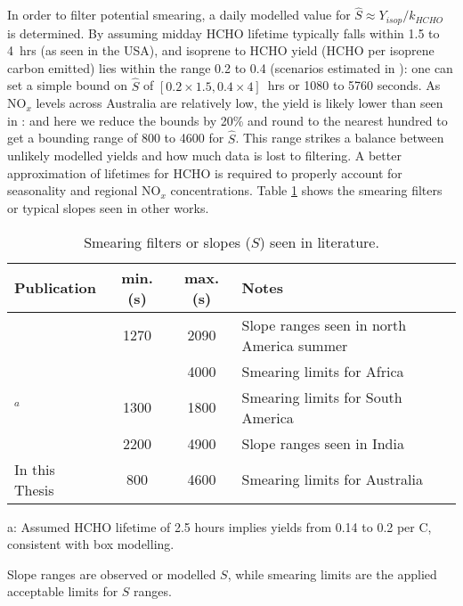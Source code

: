       In order to filter potential smearing, a daily modelled value for $\hat{S} \approx Y_{isop}/k_{HCHO}$ is determined.
      By assuming midday HCHO lifetime typically falls within 1.5 to 4~hrs (as seen in the USA), and isoprene to HCHO yield (HCHO per isoprene carbon emitted) lies within the range 0.2 to 0.4 (scenarios estimated in \textcite{Palmer2003}): one can set a simple bound on $\hat{S}$ of $[0.2 \times 1.5, 0.4 \times 4]$~hrs or 1080 to 5760 seconds.
      As NO$_x$ levels across Australia are relatively low, the yield is likely lower than seen in \textcite{Palmer2003}: and here we reduce the bounds by 20\% and round to the nearest hundred to get a bounding range of 800 to 4600 for $\hat{S}$. 
      This range strikes a balance between unlikely modelled yields and how much data is lost to filtering.
      A better approximation of lifetimes for HCHO is required to properly account for seasonality and regional NO$_x$ concentrations.
      Table \ref{BioIsop:method:smearing:tab_smearing_ranges} shows the smearing filters or typical slopes seen in other works.
      
      \begin{table}\begin{threeparttable}
          \caption{Smearing filters or slopes ($S$) seen in literature.}
          \begin{tabular}{ l | c  c  >{\centering\arraybackslash}p{5cm} } 
            \toprule
            Publication & min. (s) & max. (s) & Notes \\
            \midrule
            \textcite{Palmer2003}      & 1270 & 2090 & Slope ranges seen in north America summer \\
            \textcite{Marais2012}      &      & 4000 & Smearing limits for Africa \\
            \textcite{Barkley2013}$^a$ & 1300 & 1800 & Smearing limits for South America \\
            \textcite{Surl2018}        & 2200 & 4900 & Slope ranges seen in India \\
            In this Thesis             & 800  & 4600 & Smearing limits for Australia \\
            
            \bottomrule
          \end{tabular}
          \begin{tablenotes} 
            \item a: Assumed HCHO lifetime of 2.5 hours implies yields from 0.14 to 0.2 per C, consistent with box modelling.
            \item Slope ranges are observed or modelled $S$, while smearing limits are the applied acceptable limits for $S$ ranges. 
          \end{tablenotes}
          \label{BioIsop:method:smearing:tab_smearing_ranges}
        \end{threeparttable}\end{table}
      
